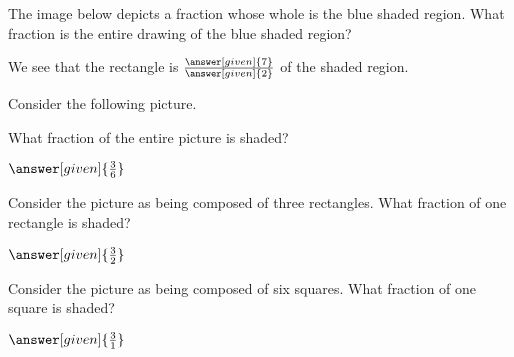 \documentclass[nooutcomes]{ximera}
\begin{document}
\begin{problem}
The image below depicts a fraction whose whole is the blue shaded region.  What fraction is the entire drawing of the blue shaded region?
\begin{center} \end{center}

\begin{prompt}
We see that the rectangle is $\frac{\answer[given]{7}}{\answer[given]{2}}$ of the shaded region.
\end{prompt}

\end{problem}



\begin{problem}
Consider the following picture.

\begin{center} \end{center}


What fraction of the entire picture is shaded?

\begin{prompt}
$\answer[given]{\frac{3}{6}}$
\end{prompt}


\begin{problem}
Consider the picture as being composed of three rectangles.  What fraction of one rectangle is shaded?

\begin{prompt}
	$\answer[given]{\frac{3}{2}}$
\end{prompt}

\begin{problem}
Consider the picture as being composed of six squares.  What fraction of one square is shaded?

\begin{prompt}
	$\answer[given]{\frac{3}{1}}$
\end{prompt}
\end{problem}
\end{problem}
\end{problem}
\end{document}
